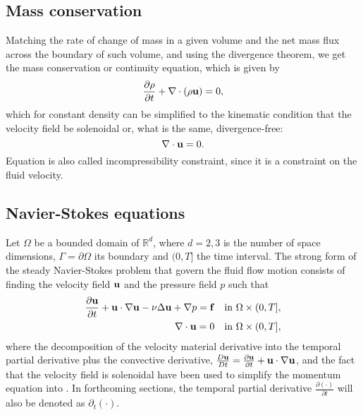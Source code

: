 \subsection{Mass conservation}
\label{subsec-mass_conservation}
Matching the rate of change of mass in a given volume and the net mass flux across the boundary of such volume, and using the divergence theorem, we get the mass conservation or continuity equation, which is given by 
\begin{equation}
\label{eq-continuity_equation_def1}
\frac{\partial\rho}{\partial t}+\nabla\cdot(\rho{\bf u})=0,
\end{equation}
which for constant density can be simplified to the kinematic condition that the velocity field be solenoidal or, what is the same, divergence-free:
\begin{equation}
\label{eq-continuity_equation_def2}
\nabla\cdot{\bf u}=0.
\end{equation}
Equation  is also called incompressibility constraint, since it is a constraint on the fluid velocity.

\subsection{Navier-Stokes equations}
\label{subsec-NS_equations}
Let $\Omega$ be a bounded domain of $\mathbb{R}^d$, where $d=2,3$ is the number of space dimensions, $\Gamma=\partial\Omega$ its boundary and $(0,T]$ the time interval. The strong form of the steady Navier-Stokes problem that govern the fluid flow motion consists of finding the velocity field ${\bf u}$ and the pressure field $p$ such that 
\begin{align}
\label{eq-NS_strong_momentum}
\frac{\partial{\bf u}}{\partial t}+{\bf u}\cdot\nabla{\bf u}-\nu\Delta{\bf u}+\nabla p={\bf f}&\quad\mbox{in }\Omega\times(0,T],\\
\label{eq-NS_strong_continuity}
\nabla\cdot{\bf u}=0&\quad\mbox{in }\Omega\times(0,T],
\end{align}
where the decomposition of the velocity material derivative into the temporal partial derivative plus the convective derivative, $\frac{D{\bf u}}{Dt}=\frac{\partial{\bf u}}{\partial t}+{\bf u}\cdot\nabla{\bf u}$, and the fact that the velocity field is solenoidal have been used to simplify the momentum equation  into . In forthcoming sections, the temporal partial derivative $ \frac{\partial(\cdot)}{\partial t} $ will also be denoted as $ \partial_t(\cdot) $.

